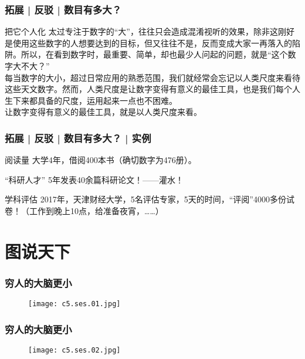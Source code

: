 \begin{frame}
  \frametitle{拓展 | 反驳 | 数目有多大？}
  \begin{block}{把它个人化}
  太过专注于数字的“大”，往往只会造成混淆视听的效果，除非这刚好是使用这些数字的人想要达到的目标，但又往往不是，反而变成大家一再落入的陷阱。所以，在看到数字时，最重要、简单，却也最少人问起的问题，就是“这个数字大不大？”\\
  \vspace{0.5em}
  每当数字的大小，超过日常应用的熟悉范围，我们就经常会忘记以人类尺度来看待这些天文数字。然而，\alert{人类尺度是让数字变得有意义的最佳工具}，也是我们每个人生下来都具备的尺度，运用起来一点也不困难。\\
  \vspace{0.5em}
  \alert{让数字变得有意义的最佳工具，就是以人类尺度来看。}
  \end{block}
\end{frame}

\begin{frame}
  \frametitle{拓展 | 反驳 | 数目有多大？ | 实例}
  \begin{block}{阅读量}
    大学4年，借阅400本书（确切数字为476册）。
  \end{block}
  \pause
  \begin{block}{“科研人才”}
    5年发表40余篇科研论文！——灌水！
  \end{block}
  \pause
  \begin{block}{学科评估}
    2017年，天津财经大学，5名评估专家，5天的时间，“评阅”4000多份试卷！（工作到晚上10点，给准备夜宵，……）
  \end{block}
\end{frame}

\section{图说天下}
\begin{frame}
  \frametitle{穷人的大脑更小}
  \begin{figure}
    \centering
    \texttt{[image: c5.ses.01.jpg]}
  \end{figure}
\end{frame}

\begin{frame}
  \frametitle{穷人的大脑更小}
  \begin{figure}
    \centering
    \texttt{[image: c5.ses.02.jpg]}
  \end{figure}
\end{frame}

